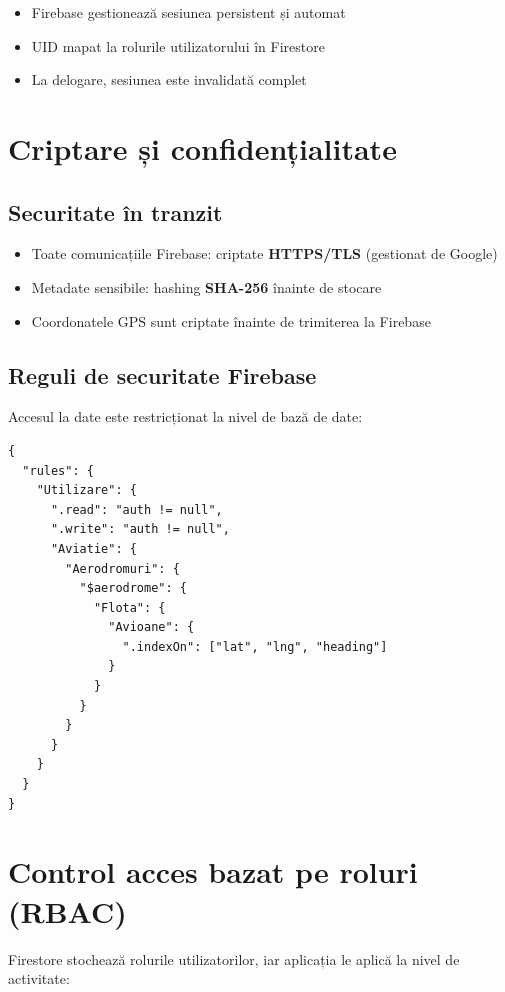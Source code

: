 \documentclass[11pt,a4paper]{report}
\begin{document}
\begin{itemize}
    \item Firebase gestionează sesiunea persistent și automat
    \item UID mapat la rolurile utilizatorului în Firestore
    \item La delogare, sesiunea este invalidată complet
\end{itemize}

\section{Criptare și confidențialitate}

\subsection{Securitate în tranzit}

\begin{itemize}
    \item Toate comunicațiile Firebase: criptate \textbf{HTTPS/TLS} (gestionat de Google)
    \item Metadate sensibile: hashing \textbf{SHA-256} înainte de stocare
    \item Coordonatele GPS sunt criptate înainte de trimiterea la Firebase
\end{itemize}

\subsection{Reguli de securitate Firebase}

Accesul la date este restricționat la nivel de bază de date:

\begin{lstlisting}
{
  "rules": {
    "Utilizare": {
      ".read": "auth != null",
      ".write": "auth != null",
      "Aviatie": {
        "Aerodromuri": {
          "$aerodrome": {
            "Flota": {
              "Avioane": {
                ".indexOn": ["lat", "lng", "heading"]
              }
            }
          }
        }
      }
    }
  }
}
\end{lstlisting}

\section{Control acces bazat pe roluri (RBAC)}

Firestore stochează rolurile utilizatorilor, iar aplicația le aplică la nivel de activitate:
\end{document}
